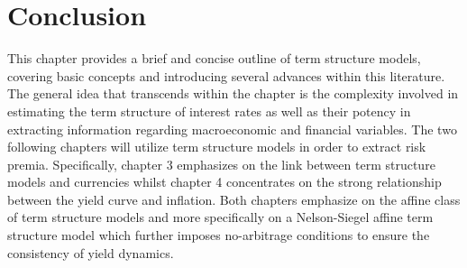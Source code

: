 \section{Conclusion}

This chapter provides a brief and concise outline of term structure models, covering basic concepts and introducing several advances within this literature. The general idea that transcends within the chapter is the complexity involved in estimating the term structure of interest rates as well as their potency in extracting information regarding macroeconomic and financial variables. The two following chapters will utilize term structure models in order to extract risk premia. Specifically, chapter 3 emphasizes on the link between term structure models and currencies whilst chapter 4 concentrates on the strong relationship between the yield curve and inflation. Both chapters emphasize on the affine class of term structure models and more specifically on a Nelson-Siegel affine term structure model which further imposes no-arbitrage conditions to ensure the consistency of yield dynamics. 


